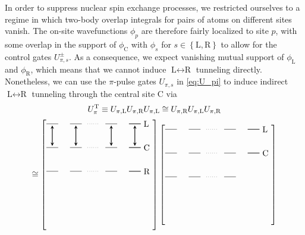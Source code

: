 \documentclass[aps,nofootinbib,notitlepage,11pt]{revtex4-1}
\renewcommand{\sp}[1]{\left[#1\right]} %
\renewcommand{\set}[1]{\left\{#1\right\}} %
\renewcommand{\L}{\text{L}}
\newcommand{\C}{\text{C}}
\newcommand{\R}{\text{R}}
\newcommand{\T}{\text{T}}
\newcommand{\1}{\mathds{1}}
\begin{document}
In order to suppress nuclear spin exchange processes, we restricted
ourselves to a regime in which two-body overlap integrals for pairs of
atoms on different sites vanish.  The on-site wavefunctions $\phi_p$
are therefore fairly localized to site $p$, with some overlap in the
support of $\phi_\C$ with $\phi_s$ for $s\in\set{\L,\R}$ to allow for
the control gates $U_{\pi,s}^\pm$.  As a consequence, we expect
vanishing mutual support of $\phi_\L$ and $\phi_\R$, which means that
we cannot induce $\L\leftrightarrow\R$ tunneling directly.
Nonetheless, we can use the $\pi$-pulse gates $U_{\pi,s}$ in
\eqref{eq:U_pi} to induce indirect $\L\leftrightarrow\R$ tunneling
through the central site $\C$ via
\begin{multline}
  U_\pi^\T
  \equiv U_{\pi,\L} U_{\pi,\R} U_{\pi,\L}
  \cong U_{\pi,\R} U_{\pi,\L} U_{\pi,\R} \\
  \cong
  \sp{\begin{tikzpicture}[
      scale=0.5,
      trans/.style={thick,<->,shorten >=2pt,shorten <=2pt,>=stealth}
      ]
      \draw (0,0) -- (1,0);
      \draw (2,0) -- (3,0);
      \draw[dotted] (3.5,0) -- (4.5,0);
      \draw (5,0) -- (6,0);
      \draw (7,0) -- (8,0);
      \draw (7,0) -- (8,0) node[right] {$\L$};
      \draw (0,-2) -- (1,-2);
      \draw (2,-2) -- (3,-2);
      \draw[dotted] (3.5,-2) -- (4.5,-2);
      \draw (5,-2) -- (6,-2);
      \draw (7,-2) -- (8,-2);
      \draw (7,-2) -- (8,-2) node[right] {$\C$};
      \draw (0,-4) -- (1,-4);
      \draw (2,-4) -- (3,-4);
      \draw[dotted] (3.5,-4) -- (4.5,-4);
      \draw (5,-4) -- (6,-4);
      \draw (7,-4) -- (8,-4);
      \draw (7,-4) -- (8,-4) node[right] {$\R$};
      \draw[trans] (0.5,0) -- (0.5,-2);
      \draw[trans] (2.5,0) -- (2.5,-2);
      \draw[trans] (5.5,0) -- (5.5,-2);
      \draw[trans] (7.5,0) -- (7.5,-2);
    \end{tikzpicture}}
  \sp{\begin{tikzpicture}[
      scale=0.5,
      trans/.style={thick,<->,shorten >=2pt,shorten <=2pt,>=stealth}
      ]
      \draw (0,0) -- (1,0);
      \draw (2,0) -- (3,0);
      \draw[dotted] (3.5,0) -- (4.5,0);
      \draw (5,0) -- (6,0);
      \draw (7,0) -- (8,0);
      \draw (7,0) -- (8,0) node[right] {$\L$};
      \draw (0,-2) -- (1,-2);
      \draw (2,-2) -- (3,-2);
      \draw[dotted] (3.5,-2) -- (4.5,-2);
      \draw (5,-2) -- (6,-2);
      \draw (7,-2) -- (8,-2);
      \draw (7,-2) -- (8,-2) node[right] {$\C$};
      \draw (0,-4) -- (1,-4);
      \draw (2,-4) -- (3,-4);
      \draw[dotted] (3.5,-4) -- (4.5,-4);
      \draw (5,-4) -- (6,-4);

\end{tikzpicture}}
\end{multline}
\end{document}
